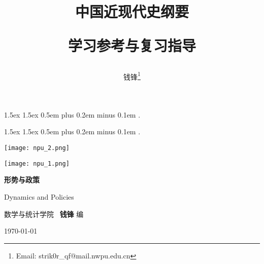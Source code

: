 \documentclass[10pt, UTF8]{ctexbook} %
\title{\textbf{中国近现代史纲要}

学习参考与复习指导}
\author{钱锋\thanks{Email: strik0r\_qf@mail.nwpu.edu.cn}}
\begin{document}
    {1.5ex}                                         %
    {1.5ex}                                         %
    {}                                              %
    {}                                              %
    {\bfseries}                                     %
    {}                                              %
    {0.5em plus 0.2em minus 0.1em}                  %
    {.}

\theoremstyle{mytheoremstyle} \newtheorem{example}{例}[section]
\theoremstyle{mytheoremstyle} \newtheorem{key}{核心要点}[section]

\theoremstyle{plain} \newtheorem{thm}{分析论述}

    {1.5ex}                                         %
    {1.5ex}                                         %
    {}                                              %
    {}                                              %
    {\kaishu}                                       %
    {}                                              %
    {0.5em plus 0.2em minus 0.1em}                  %
    {.}

\theoremstyle{my3theoremstyle}
\newtheorem*{remark}{注}
\newtheorem*{sol}{答案要点}
\newtheorem*{cmt}{评注}

\pagestyle{empty}
\begin{titlepage}
    \centering
        \texttt{[image: npu\_2.png]}\par
        \vspace{1em}
        \texttt{[image: npu\_1.png]}\par
    \vspace{1em}
        \begin{center}
            \Huge \heiti \textbf{形势与政策}

            Dynamics and Policies
        \end{center}

        \vspace{8em}
        \begin{center}

        {\kaishu 数学与统计学院} \, {\heiti\textbf{钱锋}} \quad  编
        \vspace{0.5cm}

    \today
    \end{center}
\end{titlepage}
\cleardoublepage
\restoregeometry
\end{document}
